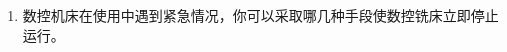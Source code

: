 \documentclass[12pt,twocolumn,landscape,UTF8,twoside]{ctexart}
\begin{document}
\begin{spacing}{1.3}
\begin{enumerate} [1、]
{3、进给速度不同：G0的速度由机床参数及快速倍率决定，档位少。G1的速度由F及进给倍率决定，可调档位多。

4、功能用途不同：G0用于加工前的定位及加工后的提刀，G1用于切削加工；

}
	
\item 数控机床在使用中遇到紧急情况，你可以采取哪几种手段使数控铣床立即停止运行。

%	
%
%
%
%
%
%
%
%
%
%
%
%
%
%
%
%
%
%
%
%
%
%
%
%
%


\end{enumerate}
\end{spacing}
\end{document}
